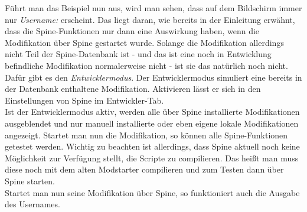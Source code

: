 \documentclass{article}
\begin{document}
Führt man das Beispiel nun aus, wird man sehen, dass auf dem Bildschirm immer nur \textit{Username: } erscheint. Das liegt daran, wie bereits in der Einleitung erwähnt, dass die Spine-Funktionen nur dann eine Auswirkung haben, wenn die Modifikation über Spine gestartet wurde. Solange die Modifikation allerdings nicht Teil der Spine-Datenbank ist - und das ist eine noch in Entwicklung befindliche Modifikation normalerweise nicht - ist sie das natürlich noch nicht. Dafür gibt es den \textit{Entwicklermodus}. Der Entwicklermodus simuliert eine bereits in der Datenbank enthaltene Modifikation. Aktivieren lässt er sich in den Einstellungen von Spine im Entwickler-Tab.\\

Ist der Entwicklermodus aktiv, werden alle über Spine installierte Modifikationen ausgeblendet und nur manuell installierte oder eben eigene lokale Modifikationen angezeigt. Startet man nun die Modifikation, so können alle Spine-Funktionen getestet werden. Wichtig zu beachten ist allerdings, dass Spine aktuell noch keine Möglichkeit zur Verfügung stellt, die Scripte zu compilieren. Das heißt man muss diese noch mit dem alten Modstarter compilieren und zum Testen dann über Spine starten.\\

Startet man nun seine Modifikation über Spine, so funktioniert auch die Ausgabe des Usernames.
\end{document}
